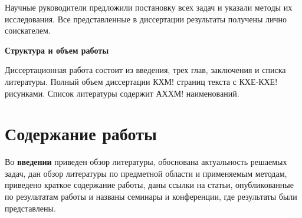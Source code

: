 Научные руководители предложили постановку всех задач и указали методы их исследования. Все представленные в диссертации результаты получены лично соискателем. 

\textbf{Структура и объем работы}

Диссертационная работа состоит из введения, трех глав, заключения и списка литературы. Полный объем диссертации КХМ! страниц текста с КХЕ-КХЕ! рисунками. Список литературы содержит АХХМ! наименований.

\section*{Содержание работы}

Во \textbf{введении} приведен обзор литературы, обоснована актуальность решаемых задач, дан обзор литературы по предметной области и применяемым методам, приведено краткое содержание работы, даны ссылки на статьи, опубликованные по результатам работы и названы семинары и конференции, где результаты были представлены.

